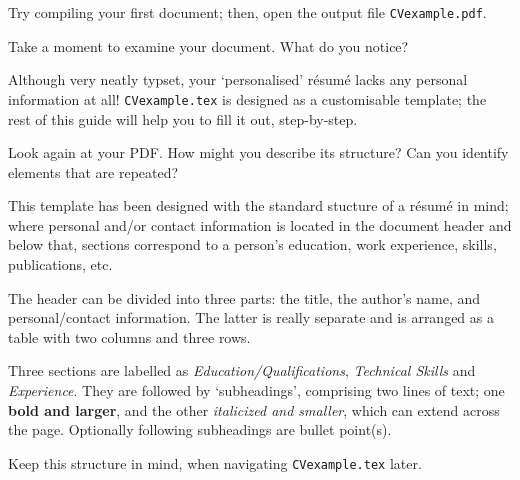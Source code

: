 \begin{instrct}
Try compiling your first document; then, open the output file \lstinline|CVexample.pdf|.
\end{instrct}

Take a moment to examine your document. What do you notice? 

Although very neatly typset, your `personalised' r\'esum\'e lacks any personal information at all! \lstinline|CVexample.tex| is designed as a customisable template; the rest of this guide will help you to fill it out, step-by-step. \par

Look again at your PDF. How might you describe its structure? Can you identify elements that are repeated?

This template has been designed with the standard stucture of a r\'esum\'e in mind; where personal and/or contact information is located in the document header and below that, sections correspond to a person's education, work experience, skills, publications, etc. \par

The header can be divided into three parts: the title, the author's name, and personal/contact information. The latter is really separate and is arranged as a table with two columns and three rows. \par

Three sections are labelled as \emph{Education/Qualifications}, \emph{Technical Skills} and \emph{Experience}. They are followed by `subheadings', comprising two lines of text; one {\bfseries bold and larger}, and the other {\footnotesize\itshape italicized and smaller}, which can extend across the page. Optionally following subheadings are bullet point(s). \par

Keep this structure in mind, when navigating \lstinline|CVexample.tex| later. \par
